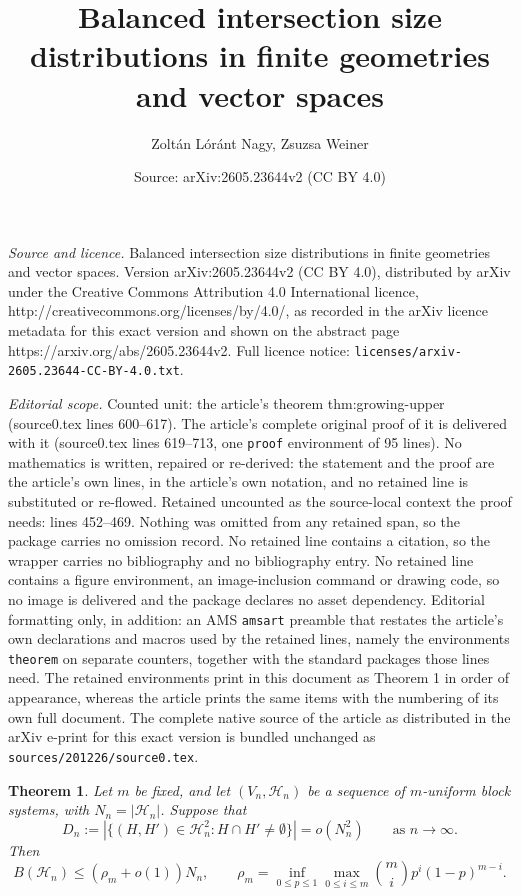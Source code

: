 \documentclass[10pt,a4paper]{amsart}
\title{Balanced intersection size distributions in finite geometries and vector spaces}
\author{Zolt\'an L\'or\'ant Nagy, Zsuzsa Weiner}
\date{Source: arXiv:2605.23644v2 (CC BY 4.0)}
\newtheorem{theorem}{Theorem}
\begin{document}
\maketitle

\noindent\emph{Source and licence.} Balanced intersection size distributions in finite geometries and vector spaces. Version arXiv:2605.23644v2 (CC BY 4.0), distributed by arXiv under the Creative Commons Attribution 4.0 International licence, http://creativecommons.org/licenses/by/4.0/, as recorded in the arXiv licence metadata for this exact version and shown on the abstract page https://arxiv.org/abs/2605.23644v2. Full licence notice: \texttt{licenses/arxiv-2605.23644-CC-BY-4.0.txt}.\par\smallskip

\noindent\textit{Editorial scope.} Counted unit: the article's theorem thm:growing-upper (source0.tex lines 600--617). The article's complete original proof of it is delivered with it (source0.tex lines 619--713, one \texttt{proof} environment of 95 lines). No mathematics is written, repaired or re-derived: the statement and the proof are the article's own lines, in the article's own notation, and no retained line is substituted or re-flowed.  Retained uncounted as the source-local context the proof needs: lines 452--469.  Nothing was omitted from any retained span, so the package carries no omission record.  No retained line contains a citation, so the wrapper carries no bibliography and no bibliography entry.  No retained line contains a figure environment, an image-inclusion command or drawing code, so no image is delivered and the package declares no asset dependency.  Editorial formatting only, in addition: an AMS \texttt{amsart} preamble that restates the article's own declarations and macros used by the retained lines, namely the environments \texttt{theorem} on separate counters, together with the standard packages those lines need.  The retained environments print in this document as Theorem 1 in order of appearance, whereas the article prints the same items with the numbering of its own full document.  The complete native source of the article as distributed in the arXiv e-print for this exact version is bundled unchanged as \texttt{sources/201226/source0.tex}.
	\begin{theorem}
		\label{thm:fixed-upper}
		\label{thm:general-hypergraph}
		Let \(m\) be fixed, and let \((V_n,\mathcal H_n)\) be a sequence of
		\(m\)-uniform block systems, with \(N_n=|\mathcal H_n|\). Suppose that
		\[
		D_n:=|\{(H,H')\in\mathcal H_n^2:H\cap H'\neq\emptyset\}|
		=o(N_n^2)
		\qquad\text{as }n\to\infty.
		\]
		Then
		\[
		B(\mathcal H_n)\leq (\rho_m+o(1))N_n,
		\qquad
		\rho_m=\inf_{0\leq p\leq1}\max_{0\leq i\leq m}
		\binom mi p^i(1-p)^{m-i}.
		\]
	\end{theorem}
\end{document}
